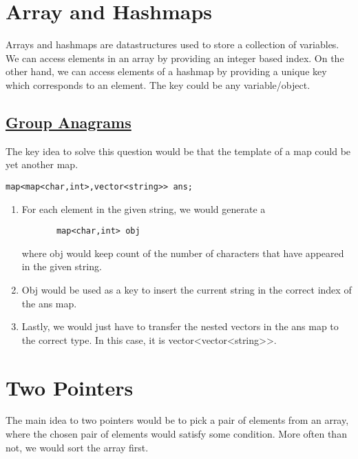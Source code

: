 \documentclass[11pt]{article}
\begin{document}
\section{Array and Hashmaps}
Arrays and hashmaps are datastructures used to store a collection of variables.
We can access elements in an array by providing an integer based index. On the other hand, we can access elements of a hashmap by providing a unique key which corresponds to an element. The key could be any variable/object.
\subsection{
 \href{https://leetcode.com/problems/group-anagrams/submissions/}{Group Anagrams}
}
The key  idea to solve this question would be that the template of a map could be yet another map.

\begin {lstlisting}
map<map<char,int>,vector<string>> ans;
\end{lstlisting}
\begin{enumerate}
 \item {
       
       For each element in the given string, we would generate a
       \begin {lstlisting}
       map<char,int> obj
       \end{lstlisting}
       where obj would keep count of the number of characters that have appeared in the given string.
       }
       
       \item{
                   Obj would be used as a key to insert the current string in the correct index of the ans map.
             }
 \item {
       Lastly, we would just have to transfer the nested vectors in the ans map to the correct type.
       In this case, it is vector<vector<string>>.
       }
\end{enumerate}

\section{Two Pointers}
The main idea to two pointers would be to pick a pair of elements from an array, where the chosen pair of elements would satisfy some condition. More often than not, we would sort the array first.
\end{document}
